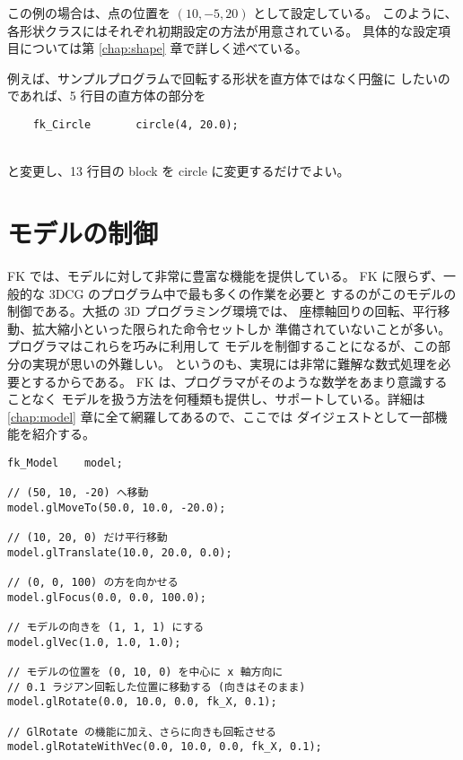 この例の場合は、点の位置を \((10, -5, 20)\) として設定している。
このように、各形状クラスにはそれぞれ初期設定の方法が用意されている。
具体的な設定項目については第 \ref{chap:shape} 章で詳しく述べている。

例えば、サンプルプログラムで回転する形状を直方体ではなく円盤に
したいのであれば、5 行目の直方体の部分を
\\
\begin{screen}
\begin{verbatim}
    fk_Circle       circle(4, 20.0);
\end{verbatim}
\end{screen}
~ \\
と変更し、13 行目の block を circle に変更するだけでよい。

\section{モデルの制御}
FK では、モデルに対して非常に豊富な機能を提供している。
FK に限らず、一般的な 3DCG のプログラム中で最も多くの作業を必要と
するのがこのモデルの制御である。大抵の 3D プログラミング環境では、
座標軸回りの回転、平行移動、拡大縮小といった限られた命令セットしか
準備されていないことが多い。プログラマはこれらを巧みに利用して
モデルを制御することになるが、この部分の実現が思いの外難しい。
というのも、実現には非常に難解な数式処理を必要とするからである。
FK は、プログラマがそのような数学をあまり意識することなく
モデルを扱う方法を何種類も提供し、サポートしている。詳細は
\ref{chap:model} 章に全て網羅してあるので、ここでは
ダイジェストとして一部機能を紹介する。
\\
\begin{screen}
\begin{verbatim}
fk_Model	model;

// (50, 10, -20) へ移動
model.glMoveTo(50.0, 10.0, -20.0);

// (10, 20, 0) だけ平行移動
model.glTranslate(10.0, 20.0, 0.0);

// (0, 0, 100) の方を向かせる
model.glFocus(0.0, 0.0, 100.0);

// モデルの向きを (1, 1, 1) にする
model.glVec(1.0, 1.0, 1.0);

// モデルの位置を (0, 10, 0) を中心に x 軸方向に
// 0.1 ラジアン回転した位置に移動する (向きはそのまま)
model.glRotate(0.0, 10.0, 0.0, fk_X, 0.1);

// GlRotate の機能に加え、さらに向きも回転させる
model.glRotateWithVec(0.0, 10.0, 0.0, fk_X, 0.1);
\end{verbatim}
\end{screen}
\\

